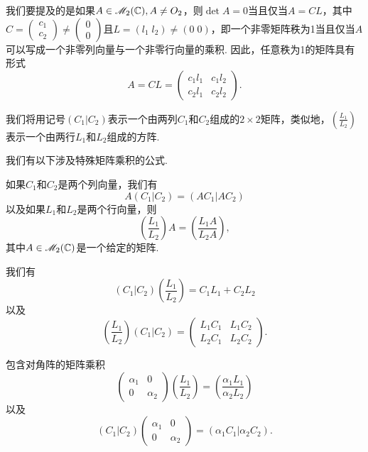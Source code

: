   \begin{nota}
    我们要提及的是如果$A\in\mathscr M_2(\mathbb C),A\ne O_2$，则$\det A=0$当且仅当$A=CL$，其中$C=\begin{pmatrix}
      c_1 \\ c_2
    \end{pmatrix}\ne\begin{pmatrix}
      0 \\ 0
    \end{pmatrix}$且$L=(l_1\;l_2)\ne(0\;0)$，即一个非零矩阵秩为1当且仅当$A$可以写成一个非零列向量与一个非零行向量的乘积. 因此，任意秩为1的矩阵具有形式
    \[
      A = CL = \begin{pmatrix}
        c_1l_1 & c_1l_2 \\
        c_2l_1 & c_2l_2
      \end{pmatrix}.
    \]
  \end{nota}

  我们将用记号$(C_1|C_2)$表示一个由两列$C_1$和$C_2$组成的$2\times2$矩阵，类似地，$\left(\frac{L_1}{L_2}\right)$表示一个由两行$L_1$和$L_2$组成的方阵.

  我们有以下涉及特殊矩阵乘积的公式.
  \begin{mybox}
    \begin{enum}
      \item 如果$C_1$和$C_2$是两个列向量，我们有
      \[
        A(C_1|C_2) = (AC_1|AC_2)
      \]
      以及如果$L_1$和$L_2$是两个行向量，则
      \[
        \left(\frac{L_1}{L_2}\right)A =
        \left( \frac{L_1A}{L_2A} \right),
      \]
      其中$A\in\mathscr M_2(\mathbb C)$是一个给定的矩阵.
      \item 我们有
      \[
        (C_1|C_2) \left( \frac{L_1}{L_2} \right)
        = C_1L_1 + C_2L_2
      \]
      以及
      \[
        \left( \frac{L_1}{L_2} \right)(C_1|C_2) =
        \begin{pmatrix}
          L_1C_1 & L_1C_2 \\
          L_2C_1 & L_2C_2
        \end{pmatrix}.
      \]
      \item 包含对角阵的矩阵乘积
      \[
        \begin{pmatrix}
          \alpha_1 & 0 \\
          0 & \alpha_2
        \end{pmatrix} \left( \frac{L_1}{L_2} \right)
        = \left( \frac{\alpha_1 L_1}{\alpha_2L_2} \right)
      \]
      以及
      \[
        (C_1|C_2) \begin{pmatrix}
          \alpha_1 & 0 \\
          0 & \alpha_2
        \end{pmatrix} = (\alpha_1C_1|\alpha_2C_2).
      \]
    \end{enum}
  \end{mybox}

